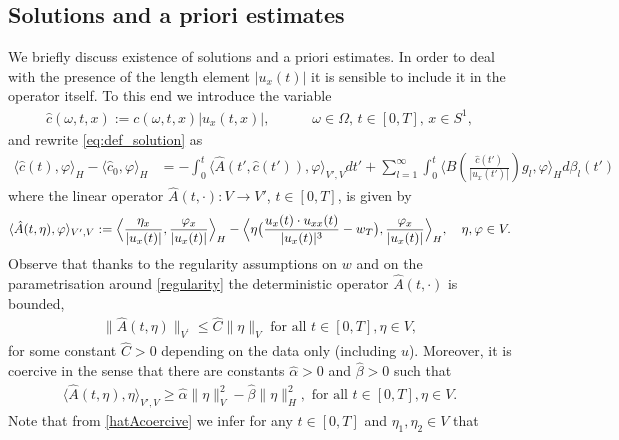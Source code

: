\documentclass[a4paper,10pt]{article}
\numberwithin{equation}{section}
\begin{document}
\subsection{Solutions and a priori estimates}
\label{sec:existenceSol}


We briefly discuss existence of solutions and a priori estimates. In order to deal with the presence of the length element $|u_{x}(t)|$
it is sensible to include it in the operator itself. To this end we introduce the variable
\begin{align}\label{eq-chc} \hat{c}(\omega,t,x):=c(\omega,t,x)|u_{x}(t,x)|, \qquad \quad \omega \in \Omega, \, t \in [0,T], \, x \in S^{1},
\end{align}
and rewrite \eqref{eq:def_solution} as
\begin{align} \label{eq:hatc}
\langle \hat{c}(t), \varphi \rangle_{H} - \langle \hat{c}_0, \varphi \rangle_{H}
& =-\int_{0}^{t} \langle \hat{A}(t', \hat{c}(t')), \varphi \rangle_{V',V} dt' + \sum_{l=1}^{\infty}\int_{0}^{t} \langle B (\frac{\hat{c}(t')}{|u_{x}(t')|}) g_{l} , \varphi \rangle_{H} d \beta_{l}(t')
\end{align}
where the linear operator $\hat{A}(t, \cdot) : V \to V'$, $t \in [0,T]$, is given by
\begin{align}\label{eqAtilda}
 \langle \hat{A}(t,\eta), \varphi \rangle_{V',V} :=
 \Big{\langle} \frac{\eta_{x}}{|u_{x}(t)|}, \frac{\varphi_{x}}{|u_{x}(t)|} \Big{\rangle}_{H}
 - \Big{\langle} \eta \big{(} \frac{u_{x}(t) \cdot u_{xx}(t)}{|u_{x}(t)|^3} - w_{T} \big{)}, \frac{\varphi_{x}}{|u_{x}(t)|} \Big{\rangle}_{H}, \quad \eta,\varphi \in V.
\end{align}
Observe that thanks to the regularity assumptions on $w$ and on the parametrisation around \eqref{regularity} the deterministic operator $\hat{A}(t,\cdot)$ is bounded,
\begin{align} \label{hatAbounded}
\| \hat{A}(t,\eta) \|_{V^{'}} \leq \hat{C} \| \eta \|_{V} \text{ for all } t \in [0,T], \eta \in V,
\end{align}
for some constant $\hat{C} > 0$ depending on the data only (including $u$). Moreover, it is coercive in the sense that there are constants $\hat{\alpha} > 0$ and $\hat{\beta} > 0$ such that
\begin{align} \label{hatAcoercive}
\langle \hat{A}(t,\eta), \eta \rangle_{V',V} \geq \hat{\alpha} \| \eta \|^{2}_{V} - \hat{\beta} \| \eta \|^{2}_{H}, \text{ for all } t \in [0,T], \eta \in V.
\end{align}
Note that from \eqref{hatAcoercive} we infer for any $t \in [0,T]$ and $\eta_{1},\eta_{2} \in V$ that
\end{document}
